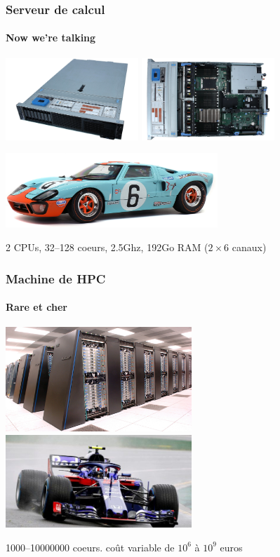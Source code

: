 \documentclass[xcolor={x11names,svgnames}]{beamer}
\begin{document}
\begin{frame}
  \frametitle{Serveur de calcul}
  \framesubtitle{Now we're talking}
  
  \centering
  \includegraphics[width=5cm]{dell1}
  \includegraphics[width=5cm]{dell2}


  
  \includegraphics[width=8cm]{gt40}

  \bigskip

  2 CPUs, 32--128 coeurs, 2.5Ghz, 192Go RAM ($2\times 6$ canaux)
\end{frame}


\begin{frame}
  \frametitle{Machine de HPC}
  \framesubtitle{Rare et cher}
  
  \centering
  \includegraphics[width=7cm]{bgp}
  \hfill
  \includegraphics[width=7cm]{f1}

  \bigskip
  
  1000--10000000 coeurs. coût variable de $10^{6}$ à $10^{9}$ euros
\end{frame}
\end{document}
